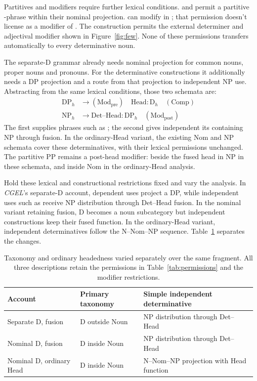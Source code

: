 \documentclass[12pt]{article}
\begin{document}
Partitives and modifiers require further lexical conditions.  and  permit a partitive -phrase within their nominal projection.  can modify  in ; that permission doesn't license  as a modifier of . The construction  permits the external determiner and adjectival modifier shown in Figure~\ref{fig:few}. None of these permissions transfers automatically to every determinative noun.

The separate-D grammar already needs nominal projection for common nouns, proper nouns and pronouns. For the determinative constructions it additionally needs a DP projection and a route from that projection to independent NP use. Abstracting from the same lexical conditions, those two schemata are:
\[
\begin{aligned}
\mathrm{DP}_{h} &\to (\mathrm{Mod}_{\mathrm{pre}})\quad \mathrm{Head}:\mathrm{D}_{h}\quad (\mathrm{Comp}) \\
\mathrm{NP}_{h} &\to \mathrm{Det\text{--}Head}:\mathrm{DP}_{h}\quad (\mathrm{Mod}_{\mathrm{post}})
\end{aligned}
\]
The first supplies phrases such as ; the second gives independent  its containing NP through fusion. In the ordinary-Head variant, the existing Nom and NP schemata cover these determinatives, with their lexical permissions unchanged. The partitive PP remains a post-head modifier: beside the fused head in NP in these schemata, and inside Nom in the ordinary-Head analysis.

Hold these lexical and constructional restrictions fixed and vary the analysis. In \textit{CGEL}'s separate-D account, dependent uses project a DP, while independent uses such as  receive NP distribution through Det--Head fusion. In the nominal variant retaining fusion, D becomes a noun subcategory but independent constructions keep their fused function. In the ordinary-Head variant, independent determinatives follow the N--Nom--NP sequence. Table~\ref{tab:economy} separates the changes.

\begin{table}[tb]
\centering\small
\caption{Taxonomy and ordinary headedness varied separately over the same fragment. All three descriptions retain the permissions in Table~\ref{tab:permissions} and the modifier restrictions.}\label{tab:economy}
\begin{tabular}{>{\raggedright\arraybackslash}p{3.1cm}>{\raggedright\arraybackslash}p{3.9cm}>{\raggedright\arraybackslash}p{4.7cm}}
\toprule
Account & Primary taxonomy & Simple independent determinative \\
\midrule
Separate D, fusion & D outside Noun & NP distribution through Det--Head \\
Nominal D, fusion & D inside Noun & NP distribution through Det--Head \\
Nominal D, ordinary Head & D inside Noun & N--Nom--NP projection with Head function \\
\bottomrule
\end{tabular}
\end{table}
\end{document}
